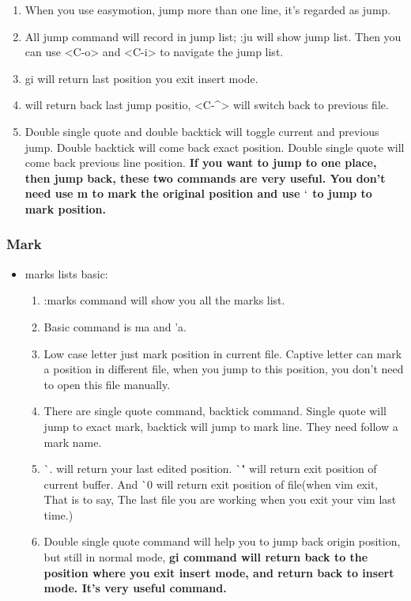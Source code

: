 \documentclass[a4paper,12pt,twoside]{book}
\begin{document}
\begin{itemize}
\begin{enumerate}
		\item When you use easymotion, jump more than one line, it's regarded as jump.

		\item All jump command will record in jump list; :ju will show jump list. Then you can use <C-o> and <C-i> to navigate the jump list. 
		
		\item gi will return last position you exit insert mode.
				
		\item <C-o> will return back last jump positio, <C-\^{}> will switch back to previous file. 

		\item Double single quote and double backtick will toggle current and previous jump. Double backtick will come back exact position. Double single quote will come back previous line position.  \textbf{If you want to jump to one place, then jump back, these two commands are very useful. You don't need use m to mark the original position and use $`$ to jump to mark position.}
\end{enumerate}
\end{itemize}

\subsubsection{Mark}

\begin{itemize}

		\item marks lists basic:
		\begin{enumerate}
				\item :marks command will show you all the marks list. 

				\item Basic command is ma and 'a. 

				\item Low case letter just mark position in current file. Captive letter can mark a position in different file, when you jump to this position, you don't need to open this file manually.

				\item There are single quote command, backtick command. Single quote will jump to exact mark, backtick will jump to mark line. They need follow a mark name.

				\item \`{}. will return your last edited position.  \`{}" will return exit position of current buffer. And \`{}0 will return exit position of file(when vim exit, That is to say, The last file you are working when you exit your vim last time.) 

				\item Double single quote command will help you to jump back origin position, but still in normal mode, \textbf{gi command will return back to the position where you exit insert mode, and return back to insert mode. It's very useful command. }
				
\end{enumerate}
\end{itemize}
\end{document}
